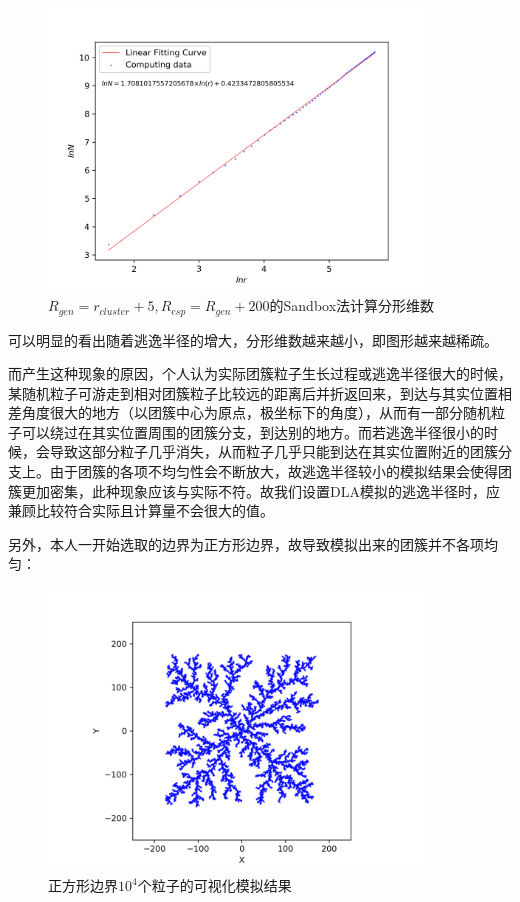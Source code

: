 \documentclass[a4paper,11pt]{article}
\begin{document}
\begin{figure}[!htbp]        
\centering
\includegraphics[bb= 0 0 460.8 345.6, width = 10cm]{分形维数/sandbox-5-205.png}      
\caption{$R_{gen} = r_{cluster} + 5, R_{esp} = R_{gen}+200$的Sandbox法计算分形维数}      
\end{figure}

\newpage
可以明显的看出随着逃逸半径的增大，分形维数越来越小，即图形越来越稀疏。

而产生这种现象的原因，个人认为实际团簇粒子生长过程或逃逸半径很大的时候，某随机粒子可游走到相对团簇粒子比较远的距离后并折返回来，到达与其实位置相差角度很大的地方（以团簇中心为原点，极坐标下的角度），从而有一部分随机粒子可以绕过在其实位置周围的团簇分支，到达别的地方。而若逃逸半径很小的时候，会导致这部分粒子几乎消失，从而粒子几乎只能到达在其实位置附近的团簇分支上。由于团簇的各项不均匀性会不断放大，故逃逸半径较小的模拟结果会使得团簇更加密集，此种现象应该与实际不符。故我们设置DLA模拟的逃逸半径时，应兼顾比较符合实际且计算量不会很大的值。


另外，本人一开始选取的边界为正方形边界，故导致模拟出来的团簇并不各项均匀：


\begin{figure}[!htbp]        
\centering
\includegraphics[bb= 0 0 460.8 345.6, width = 10cm]{500-104-1.png}      
\caption{正方形边界$10^{4}$个粒子的可视化模拟结果}      
\end{figure}
\end{document}
